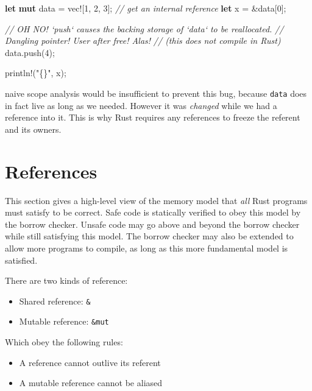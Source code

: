 \documentclass[a4paper,]{book}
\newenvironment{Shaded}{\begin{snugshade}}{\end{snugshade}}
\newcommand{\KeywordTok}[1]{\textcolor[rgb]{0.13,0.29,0.53}{\textbf{{#1}}}}
\newcommand{\DecValTok}[1]{\textcolor[rgb]{0.00,0.00,0.81}{{#1}}}
\newcommand{\StringTok}[1]{\textcolor[rgb]{0.31,0.60,0.02}{{#1}}}
\newcommand{\CommentTok}[1]{\textcolor[rgb]{0.56,0.35,0.01}{\textit{{#1}}}}
\newcommand{\OtherTok}[1]{\textcolor[rgb]{0.56,0.35,0.01}{{#1}}}
\newcommand{\NormalTok}[1]{{#1}}
\begin{document}
\begin{Shaded}
\begin{Highlighting}[]
\KeywordTok{let} \KeywordTok{mut} \NormalTok{data = }\OtherTok{vec!}\NormalTok{[}\DecValTok{1}\NormalTok{, }\DecValTok{2}\NormalTok{, }\DecValTok{3}\NormalTok{];}
\CommentTok{// get an internal reference}
\KeywordTok{let} \NormalTok{x = &data[}\DecValTok{0}\NormalTok{];}

\CommentTok{// OH NO! `push` causes the backing storage of `data` to be reallocated.}
\CommentTok{// Dangling pointer! User after free! Alas!}
\CommentTok{// (this does not compile in Rust)}
\NormalTok{data.push(}\DecValTok{4}\NormalTok{);}

\OtherTok{println!}\NormalTok{(}\StringTok{"\{\}"}\NormalTok{, x);}
\end{Highlighting}
\end{Shaded}

naive scope analysis would be insufficient to prevent this bug, because
\texttt{data} does in fact live as long as we needed. However it was
\emph{changed} while we had a reference into it. This is why Rust
requires any references to freeze the referent and its owners.

\section{References}\label{sec--references}

This section gives a high-level view of the memory model that \emph{all}
Rust programs must satisfy to be correct. Safe code is statically
verified to obey this model by the borrow checker. Unsafe code may go
above and beyond the borrow checker while still satisfying this model.
The borrow checker may also be extended to allow more programs to
compile, as long as this more fundamental model is satisfied.

There are two kinds of reference:

\begin{itemize}
\itemsep1pt\parskip0pt
\item
  Shared reference: \texttt{\&}
\item
  Mutable reference: \texttt{\&mut}
\end{itemize}

Which obey the following rules:

\begin{itemize}
\itemsep1pt\parskip0pt
\item
  A reference cannot outlive its referent
\item
  A mutable reference cannot be aliased
\end{itemize}
\end{document}
